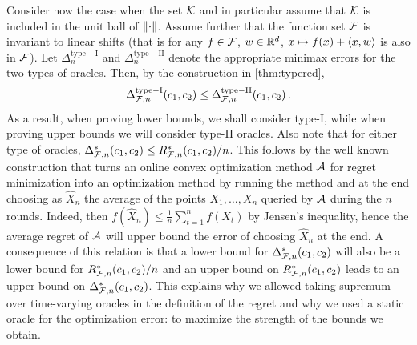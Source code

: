 Consider now the case when the set $\mathcal{K}$ and in particular assume that 
$\mathcal{K}$ is included in the unit ball of $\left\|\cdot\right\|$.
Assume further that the function set $\mathcal{F}$ is invariant to linear shifts
(that is for any $f\in \mathcal{F}$, $w\in \mathbb{R}^d$, $x\mapsto f(x) + \langle x,w \rangle$ is also in $\mathcal{F}$).
Let
 $\Delta_{n}^{\mathrm{type-I}}$ and $\Delta_{n}^{\mathrm{type-II}}$ denote  the appropriate minimax errors for the two types of oracles.
Then, by the construction in  \cref{thm:typered},
\[
\Delta_{\mathcal{F},n}^{\mathrm{type-I}}(c_1,c_2) \le \Delta_{\mathcal{F},n}^{\mathrm{type-II}}(c_1,c_2)\,.
\]
As a result, when proving lower bounds, we shall consider type-I, while when proving upper bounds we will consider type-II oracles.
Also note that for either type of oracles, $\Delta_{\mathcal{F},n}^*(c_1,c_2) \le R_{\mathcal{F},n}^*(c_1,c_2)/n$. This follows by the well known construction that turns an online convex optimization method $\mathcal{A}$ for regret minimization into an optimization method by running the method and at the end choosing as $\hat{X}_n$ the average of the points $X_1,\dots,X_n$ queried by $\mathcal{A}$ during the $n$ rounds.
Indeed, then $f(\hat{X}_n) \le \frac1n \sum_{t=1}^n f(X_t)$ by Jensen's inequality, hence the average regret of $\mathcal{A}$ will upper bound the error of choosing $\hat{X}_n$ at the end.
A consequence of this relation is that a lower bound for $\Delta_{\mathcal{F},n}^*(c_1,c_2) $ will also be a lower bound for $R^*_{\mathcal{F},n}(c_1,c_2)/n$ and an upper bound on $R^*_{\mathcal{F},n}(c_1,c_2)$ leads to an upper bound on $\Delta_{\mathcal{F},n}^*(c_1,c_2)$. This explains why we allowed taking supremum over time-varying oracles in the definition of the regret and why we used a static oracle for the optimization error: to maximize the strength of the bounds we obtain.

